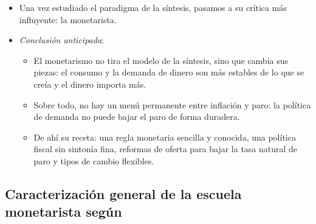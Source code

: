 \documentclass[11pt]{article}
\begin{document}
\begin{itemize}
\item Una vez estudiado el paradigma de la síntesis, pasamos a su crítica más influyente: la monetarista.
\item \emph{Conclusión anticipada}:
  \begin{itemize}
  \item El monetarismo no tira el modelo de la síntesis, sino que cambia sus piezas: el consumo y la demanda de dinero son más estables de lo que se creía y el dinero importa más.
  \item Sobre todo, no hay un menú permanente entre inflación y paro: la política de demanda no puede bajar el paro de forma duradera.
  \item De ahí su receta: una regla monetaria sencilla y conocida, una política fiscal sin sintonía fina, reformas de oferta para bajar la tasa natural de paro y tipos de cambio flexibles.
  \end{itemize}
\end{itemize}

\subsection{Caracterización general de la escuela monetarista según }\label{sec:caracterizacion-monetarismo}
\end{document}

